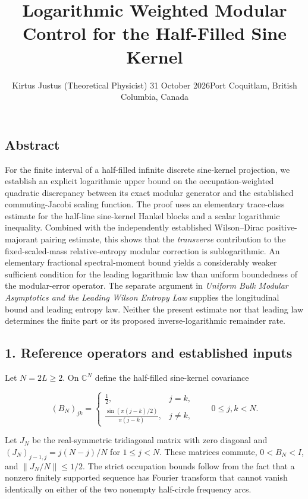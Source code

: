 \documentclass[
  10pt,
  a4paper,
]{article}
\title{Logarithmic Weighted Modular Control for the Half-Filled Sine Kernel}
\author{Kirtus Justus (Theoretical Physicist) \textbullet{} 31 October 2026\tabularnewline Port Coquitlam, British Columbia, Canada}
\date{}
\begin{document}
\maketitle

\subsection{Abstract}\label{abstract}

For the finite interval of a half-filled infinite discrete sine-kernel projection, we establish an explicit logarithmic upper bound on the occupation-weighted quadratic discrepancy between its exact modular generator and the established commuting-Jacobi scaling function. The proof uses an elementary trace-class estimate for the half-line sine-kernel Hankel blocks and a scalar logarithmic inequality. Combined with the independently established Wilson--Dirac positive-majorant pairing estimate, this shows that the \emph{transverse} contribution to the fixed-scaled-mass relative-entropy modular correction is sublogarithmic. An elementary fractional spectral-moment bound yields a considerably weaker sufficient condition for the leading logarithmic law than uniform boundedness of the modular-error operator. The separate argument in \emph{Uniform Bulk Modular Asymptotics and the Leading Wilson Entropy Law} supplies the longitudinal bound and leading entropy law. Neither the present estimate nor that leading law determines the finite part or its proposed inverse-logarithmic remainder rate.

\subsection{1. Reference operators and established inputs}\label{reference-operators-and-established-inputs}

Let \(N=2L\ge2\). On \(\mathbb C^N\) define the half-filled sine-kernel covariance

\[
(B_N)_{jk}=\begin{cases}\tfrac12,&j=k,\\[2pt]
\displaystyle\frac{\sin(\pi(j-k)/2)}{\pi(j-k)},&j\ne k,
\end{cases}\qquad 0\le j,k<N.
\]

Let \(J_N\) be the real-symmetric tridiagonal matrix with zero diagonal and \((J_N)_{j-1,j}=j(N-j)/N\) for \(1\le j<N\). These matrices commute, \(0<B_N<I\), and \(\|J_N/N\|\le1/2\). The strict occupation bounds follow from the fact that a nonzero finitely supported sequence has Fourier transform that cannot vanish identically on either of the two nonempty half-circle frequency arcs.
\end{document}
